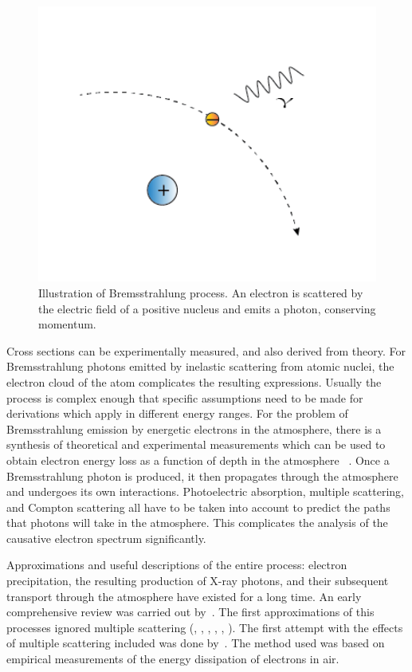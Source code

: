 \begin{figure}[p]
\label{brem_schematic}
\centering
\includegraphics[width=1.0\textwidth]{figures/chapter_3/brem_schematic/brem-schematic-02.png}
\caption{Illustration of Bremsstrahlung process. An electron is scattered by the electric field of a positive nucleus and emits a photon, conserving momentum. }
\end{figure}

Cross sections can be experimentally measured, and also derived from theory. For Bremsstrahlung photons emitted by inelastic scattering from atomic nuclei, the electron cloud of the atom complicates the resulting expressions. Usually the process is complex enough that specific assumptions need to be made for derivations which apply in different energy ranges. For the problem of Bremsstrahlung emission by energetic electrons in the atmosphere, there is a synthesis of theoretical and experimental measurements which can be used to obtain electron energy loss as a function of depth in the atmosphere~ \citep{Berger1972}. Once a Bremsstrahlung photon is produced, it then propagates through the atmosphere and undergoes its own interactions. Photoelectric absorption, multiple scattering, and Compton scattering all have to be taken into account to predict the paths that photons will take in the atmosphere\citep{Berger1972}. This complicates the analysis of the causative electron spectrum significantly. 

Approximations and useful descriptions of the entire process: electron precipitation, the resulting production of X-ray photons, and their subsequent transport through the atmosphere have existed for a long time. An early comprehensive review was carried out by~\citet{Brown1966a}. The first approximations of this processes ignored multiple scattering (\citet{Anderson1960}, \citet{Brown1965}, \citet{Christensen1970}, \citet{Barcus1966}, \citet{KAMIYAMA1966}, \citet{Polk1965}). The first attempt with the effects of multiple scattering included was done by~\citet{Rees1963}. The method used was based on empirical measurements of the energy dissipation of electrons in air.

